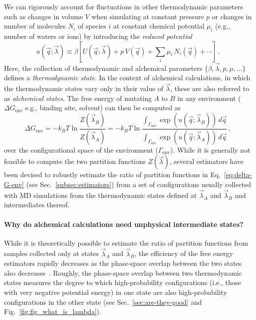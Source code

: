 \documentclass[9pt,bestpractices,pubversion]{livecoms}
\begin{document}
We can rigorously account for fluctuations in other thermodynamic parameters such as changes in volume $V$ when simulating at constant pressure $p$ or changes in number of molecules $N_i$ of species $i$ at constant chemical potential $\mu_i$ (e.g., number of waters or ions) by introducing the \textit{reduced potential}~\cite{shirts2008statisticallya}
\begin{equation}\label{eq:reduced-potential}
u(\vec{q};\vec{\lambda}) \equiv \beta \left[ U(\vec{q};\vec{\lambda}) + p \, V(\vec{q}) + \sum_i \mu_i \, N_i(\vec{q}) + \cdots \right] \, .
\end{equation}
Here, the collection of thermodynamic and alchemical parameters $\{\beta, \vec{\lambda}, p, \mu, \ldots\}$ defines a \emph{thermodynamic state}.
In the context of alchemical calculations, in which the thermodynamic states vary only in their value of $\vec{\lambda}$, these are also referred to as \emph{alchemical states}.
The free energy of mutating $A$ to $B$ in any environment ($\Delta G_{\mathrm{env}}$ e.g., binding site, solvent) can then be computed as
\begin{equation}\label{eq:delta-G-env}
    \Delta G_{\mathrm{env}} = - k_BT \ln \frac{Z(\vec{\lambda}_B)}{Z(\vec{\lambda}_A)} = - k_BT \ln \frac{\int_{\Gamma_{\mathrm{env}}} \exp\left( u(\vec{q}; \vec{\lambda}_B) \right) \, d\vec{q}}{\int_{\Gamma_{\mathrm{env}}} \exp\left( u(\vec{q}; \vec{\lambda}_A) \right) \, d\vec{q}} \, ,
\end{equation}
over the configurational space of the environment ($\Gamma_{\mathrm{env}}$).
While it is generally not feasible to compute the two partition functions $Z(\vec{\lambda})$, several estimators have been devised to robustly estimate the ratio of partition functions in Eq.~\ref{eq:delta-G-env} (see Sec.~\ref{subsec:estimators}) from a set of configurations usually collected with MD simulations from the thermodynamic states defined at $\vec{\lambda}_A$ and $\vec{\lambda}_B$ and intermediates thereof.

\paragraph{Why do alchemical calculations need unphysical intermediate states?}
While it is theoretically possible to estimate the ratio of partition functions from samples collected only at states $\vec{\lambda}_A$ and $\vec{\lambda}_B$, the efficiency of the free energy estimators rapidly decreases as the phase-space overlap between the two states also decreases~\cite{wu2005phasespace, wu2005phasespacea}.
Roughly, the phase-space overlap between two thermodynamic states measures the degree to which high-probability configurations (i.e., those with very negative potential energy) in one state are also high-probability configurations in the other state (see Sec.~\ref{sec:are-they-good} and Fig.~\ref{fig:fig_what_is_lambda}).
\end{document}
